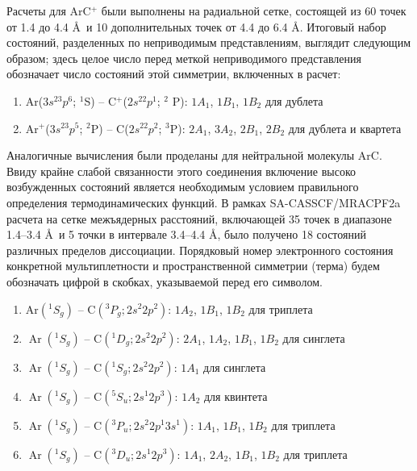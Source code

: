 \documentclass[12pt]{extarticle}
\begin{document}
	Расчеты для ArC$^+$ были выполнены на радиальной сетке, состоящей из 60 точек от 1.4 до 4.4 \AA\ и 10 дополнительных точек от 4.4 до 6.4 \AA. Итоговый набор состояний, разделенных по неприводимым представлениям, выглядит следующим образом; здесь целое число перед меткой неприводимого представления обозначает число состояний этой симметрии, включенных в расчет:
	
	\begin{enumerate}
		\item Ar($3s^23p^6$; $^1$S) -- C$^+$($2s^22p^1$; $^2$ P): $1A_1$, $1B_1$, $1B_2$ для дублета
		\item Ar$^+$($3s^23p^5$; $^2$P) -- C($2s^22p^2$; $^3$P): $2A_1$, $3A_2$, $2B_1$, $2B_2$ для дублета и квартета
	\end{enumerate}
	
	Аналогичные вычисления были проделаны для нейтральной молекулы ArC. Ввиду крайне слабой связанности этого соединения включение высоко возбужденных состояний является необходимым условием правильного определения термодинамических функций. В рамках SA-CASSCF/MRACPF2a расчета на сетке межъядерных расстояний, включающей 35 точек в диапазоне 1.4--3.4 \AA\ и 5 точки в интервале 3.4--4.4 \AA, было получено 18 состояний различных пределов диссоциации. Порядковый номер электронного состояния конкретной мультиплетности и пространственной симметрии (терма) будем обозначать цифрой в скобках, указываемой перед его символом.
	
	\begin{enumerate}
		\item $\text{Ar}\left({ }^1 S_g\right)\text{ -- }\text{C}\left({ }^3 P_g ; 2 s^2 2 p^2\right)$: $1A_2$, $1B_1$, $1B_2$ для триплета
		\item $\operatorname{Ar}\left({ }^1 S_g\right) \text{ -- }\text{C}\left({ }^1 D_g ; 2 s^2 2 p^2\right)$: $2A_1$, $1A_2$, $1B_1$, $1B_2$ для синглета
		\item $\operatorname{Ar}\left({ }^1 S_g\right) \text{ -- } \text{C}\left({ }^1 S_g ; 2 s^2 2 p^2\right)$: $1A_1$ для синглета
		\item $\operatorname{Ar}\left({ }^1 S_g\right) \text{ -- } \text{C}\left({ }^5 S_u ; 2 s^1 2 p^3\right)$: $1A_2$ для квинтета
		\item $\operatorname{Ar}\left({ }^1 S_g\right) \text{ -- } \text{C}\left({ }^3 P_u ; 2 s^2 2 p^1 3 s^1\right)$: $1A_1$, $1B_1$, $1B_2$ для триплета
		\item $\operatorname{Ar}\left({ }^1 S_g\right) \text{ -- } \text{C}\left(^3 D_u ; 2 s^1 2 p^3\right)$: $1A_1$, $2A_2$, $1B_1$, $1B_2$ для триплета
	\end{enumerate}
	
\end{document}
